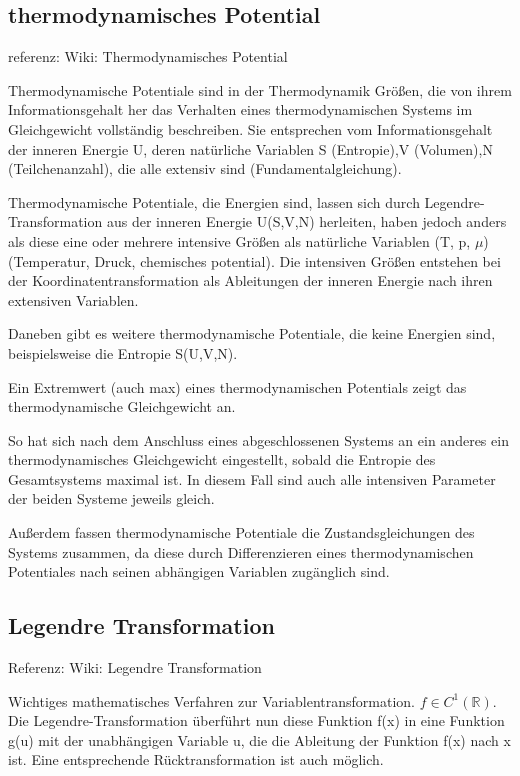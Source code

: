 \documentclass[]{article}
\begin{document}
\subsection{thermodynamisches Potential}
referenz: Wiki: Thermodynamisches Potential

Thermodynamische Potentiale sind in der Thermodynamik Größen, die von ihrem Informationsgehalt her das Verhalten eines thermodynamischen Systems im Gleichgewicht vollständig beschreiben. Sie entsprechen vom Informationsgehalt der inneren Energie U, deren natürliche Variablen S (Entropie),V (Volumen),N (Teilchenanzahl), die alle extensiv sind (Fundamentalgleichung).

Thermodynamische Potentiale, die Energien sind, lassen sich durch Legendre-Transformation aus der inneren Energie U(S,V,N) herleiten, haben jedoch anders als diese eine oder mehrere intensive Größen als natürliche Variablen (T, p, $\mu$) (Temperatur, Druck, chemisches potential). Die intensiven Größen entstehen bei der Koordinatentransformation als Ableitungen der inneren Energie nach ihren extensiven Variablen.

Daneben gibt es weitere thermodynamische Potentiale, die keine Energien sind, beispielsweise die Entropie S(U,V,N).

Ein Extremwert (auch max) eines thermodynamischen Potentials zeigt das thermodynamische Gleichgewicht an.

So hat sich nach dem Anschluss eines abgeschlossenen Systems an ein anderes ein thermodynamisches Gleichgewicht eingestellt, sobald die Entropie des Gesamtsystems maximal ist. In diesem Fall sind auch alle intensiven Parameter der beiden Systeme jeweils gleich. 

Außerdem fassen thermodynamische Potentiale die Zustandsgleichungen des Systems zusammen, da diese durch Differenzieren eines thermodynamischen Potentiales nach seinen abhängigen Variablen zugänglich sind. 

\subsection{Legendre Transformation}
Referenz: Wiki: Legendre Transformation

Wichtiges  mathematisches Verfahren zur Variablentransformation. $f \in C^1(\mathbb{R})$. Die Legendre-Transformation überführt nun diese Funktion f(x) in eine Funktion g(u) mit der unabhängigen Variable u, die die Ableitung der Funktion f(x) nach x ist. Eine entsprechende Rücktransformation ist auch möglich.
\end{document}
